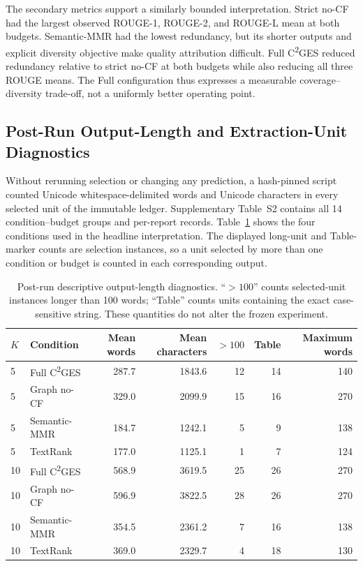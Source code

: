\documentclass[applsci,article,submit,moreauthors]{Definitions/mdpi}
\newcommand{\cges}{C\textsuperscript{2}GES}
\begin{document}
The secondary metrics support a similarly bounded interpretation. Strict no-CF had the largest observed ROUGE-1, ROUGE-2, and ROUGE-L mean at both budgets. Semantic-MMR had the lowest redundancy, but its shorter outputs and explicit diversity objective make quality attribution difficult. Full \cges{} reduced redundancy relative to strict no-CF at both budgets while also reducing all three ROUGE means. The Full configuration thus expresses a measurable coverage--diversity trade-off, not a uniformly better operating point.

\subsection{Post-Run Output-Length and Extraction-Unit Diagnostics}

Without rerunning selection or changing any prediction, a hash-pinned script counted Unicode whitespace-delimited words and Unicode characters in every selected unit of the immutable ledger. Supplementary Table~S2 contains all 14 condition--budget groups and per-report records. Table~\ref{tab:length-audit} shows the four conditions used in the headline interpretation. The displayed long-unit and Table-marker counts are selection instances, so a unit selected by more than one condition or budget is counted in each corresponding output.

\begin{table}[H]
\caption{Post-run descriptive output-length diagnostics. ``$>100$'' counts selected-unit instances longer than 100 words; ``Table'' counts units containing the exact case-sensitive string. These quantities do not alter the frozen experiment.}
\label{tab:length-audit}\centering\small
\begin{tabular}{llrrrrr}
\toprule
$K$ & Condition & Mean words & Mean characters & $>100$ & Table & Maximum words\\
\midrule
5 & Full \cges{} & 287.7 & 1843.6 & 12 & 14 & 140\\
5 & Graph no-CF & 329.0 & 2099.9 & 15 & 16 & 270\\
5 & Semantic-MMR & 184.7 & 1242.1 & 5 & 9 & 138\\
5 & TextRank & 177.0 & 1125.1 & 1 & 7 & 124\\
10 & Full \cges{} & 568.9 & 3619.5 & 25 & 26 & 270\\
10 & Graph no-CF & 596.9 & 3822.5 & 28 & 26 & 270\\
10 & Semantic-MMR & 354.5 & 2361.2 & 7 & 16 & 138\\
10 & TextRank & 369.0 & 2329.7 & 4 & 18 & 130\\
\bottomrule
\end{tabular}
\end{table}
\end{document}

